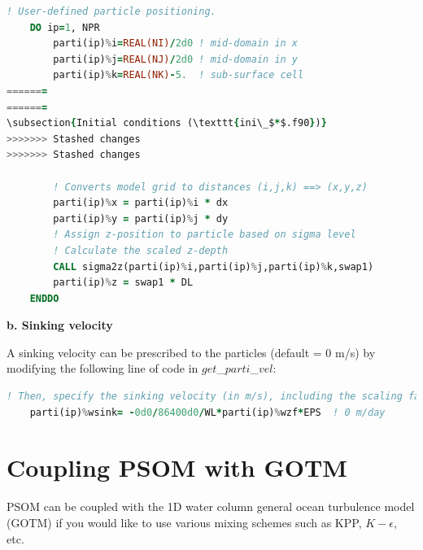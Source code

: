 \documentclass[12pt,letterpaper,titlepage]{article}
\begin{document}
\begin{lstlisting}[language=fortran]
! User-defined particle positioning.    
	DO ip=1, NPR
		parti(ip)%i=REAL(NI)/2d0 ! mid-domain in x
		parti(ip)%j=REAL(NJ)/2d0 ! mid-domain in y
		parti(ip)%k=REAL(NK)-5.  ! sub-surface cell
=======
=======
\subsection{Initial conditions (\texttt{ini\_$*$.f90})}
>>>>>>> Stashed changes
>>>>>>> Stashed changes

		! Converts model grid to distances (i,j,k) ==> (x,y,z)
		parti(ip)%x = parti(ip)%i * dx
		parti(ip)%y = parti(ip)%j * dy
		! Assign z-position to particle based on sigma level
		! Calculate the scaled z-depth
		CALL sigma2z(parti(ip)%i,parti(ip)%j,parti(ip)%k,swap1)
		parti(ip)%z = swap1 * DL
	ENDDO
\end{lstlisting}
\textbf{\indent b. Sinking velocity\\}

A sinking velocity can be prescribed to the particles (default = 0 m/s) by modifying the following line of code in $get$\_$parti$\_$vel$:

\begin{lstlisting}[language=fortran]
! Then, specify the sinking velocity (in m/s), including the scaling factors
	parti(ip)%wsink= -0d0/86400d0/WL*parti(ip)%wzf*EPS  ! 0 m/day
\end{lstlisting}


\section{Coupling PSOM with GOTM}
PSOM can be coupled with the 1D water column general ocean turbulence model (GOTM) if you would like to use various mixing schemes such as KPP, $K-\epsilon,$ etc. 
\end{document}
